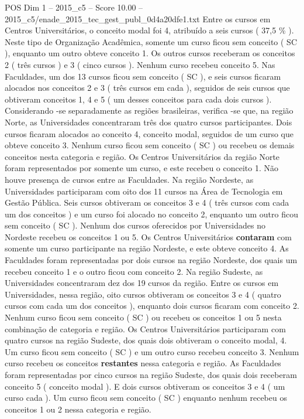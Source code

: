 \begin{textsample}{POS Dim 1 – 2015\_c5 – Score 10.00 – 2015\_c5/enade\_2015\_tec\_gest\_publ\_0d4a20dfe1.txt}
Entre os cursos em Centros Universitários, o conceito modal foi 4, atribuído a seis cursos ( 37,5 \% ).
Neste tipo de Organização Acadêmica, somente um curso ficou sem conceito ( SC ), enquanto um outro obteve conceito 1.
Os outros cursos receberam os conceitos 2 ( três cursos ) e 3 ( cinco cursos ).
Nenhum curso recebeu conceito 5.
Nas Faculdades, um dos 13 cursos ficou sem conceito ( SC ), e seis cursos ficaram alocados nos conceitos 2 e 3 ( três cursos em cada ), seguidos de seis cursos que obtiveram conceitos 1, 4 e 5 ( um desses conceitos para cada dois cursos ).
Considerando -se separadamente as regiões brasileiras, verifica -se que, na região Norte, as Universidades concentraram três dos quatro cursos participantes.
Dois cursos ficaram alocados ao conceito 4, conceito modal, seguidos de um curso que obteve conceito 3.
Nenhum curso ficou sem conceito ( SC ) ou recebeu os demais conceitos nesta categoria e região.
Os Centros Universitários da região Norte foram representados por somente um curso, e este recebeu o conceito 1.
Não houve presença de cursos entre as Faculdades.
Na região Nordeste, as Universidades participaram com oito dos 11 cursos na Área de Tecnologia em Gestão Pública.
Seis cursos obtiveram os conceitos 3 e 4 ( três cursos com cada um dos conceitos ) e um curso foi alocado no conceito 2, enquanto um outro ficou sem conceito ( SC ).
Nenhum dos cursos oferecidos por Universidades no Nordeste recebeu os conceitos 1 ou 5.
Os Centros Universitários \textbf{contaram} com somente um curso participante na região Nordeste, e este obteve conceito 4.
As Faculdades foram representadas por dois cursos na região Nordeste, dos quais um recebeu conceito 1 e o outro ficou com conceito 2.
Na região Sudeste, as Universidades concentraram dez dos 19 cursos da região.
Entre os cursos em Universidades, nessa região, oito cursos obtiveram os conceitos 3 e 4 ( quatro cursos com cada um dos conceitos ), enquanto dois cursos ficaram com conceito 2.
Nenhum curso ficou sem conceito ( SC ) ou recebeu os conceitos 1 ou 5 nesta combinação de categoria e região.
Os Centros Universitários participaram com quatro cursos na região Sudeste, dos quais dois obtiveram o conceito modal, 4.
Um curso ficou sem conceito ( SC ) e um outro curso recebeu conceito 3.
Nenhum curso recebeu os conceitos \textbf{restantes} nessa categoria e região.
As Faculdades foram representadas por cinco cursos na região Sudeste, dos quais dois receberam conceito 5 ( conceito modal ).
E dois cursos obtiveram os conceitos 3 e 4 ( um curso cada ).
Um curso ficou sem conceito ( SC ) enquanto nenhum recebeu os conceitos 1 ou 2 nessa categoria e região.

\end{textsample}
